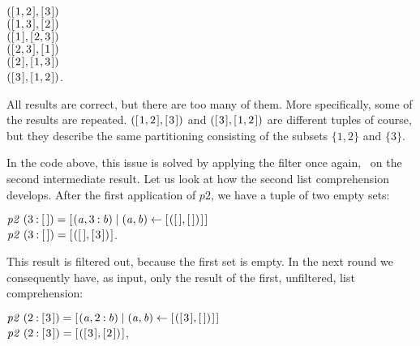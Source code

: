\documentclass{scrreprt}
\newcommand{\Varid}[1]{\mathit{#1}}
\begin{document}
\ensuremath{([\mskip1.5mu \mathrm{1},\mathrm{2}\mskip1.5mu],[\mskip1.5mu \mathrm{3}\mskip1.5mu])}\\
\ensuremath{([\mskip1.5mu \mathrm{1},\mathrm{3}\mskip1.5mu],[\mskip1.5mu \mathrm{2}\mskip1.5mu])}\\
\ensuremath{([\mskip1.5mu \mathrm{1}\mskip1.5mu],[\mskip1.5mu \mathrm{2},\mathrm{3}\mskip1.5mu])}\\
\ensuremath{([\mskip1.5mu \mathrm{2},\mathrm{3}\mskip1.5mu],[\mskip1.5mu \mathrm{1}\mskip1.5mu])}\\
\ensuremath{([\mskip1.5mu \mathrm{2}\mskip1.5mu],[\mskip1.5mu \mathrm{1},\mathrm{3}\mskip1.5mu])}\\
\ensuremath{([\mskip1.5mu \mathrm{3}\mskip1.5mu],[\mskip1.5mu \mathrm{1},\mathrm{2}\mskip1.5mu])}.

All results are correct,
but there are too many of them.
More specifically, some of the results are repeated.
\ensuremath{([\mskip1.5mu \mathrm{1},\mathrm{2}\mskip1.5mu],[\mskip1.5mu \mathrm{3}\mskip1.5mu])} and \ensuremath{([\mskip1.5mu \mathrm{3}\mskip1.5mu],[\mskip1.5mu \mathrm{1},\mathrm{2}\mskip1.5mu])} are different tuples of course,
but they describe the same partitioning
consisting of the subsets 
$\lbrace 1,2\rbrace$ and $\lbrace 3\rbrace$.

In the code above, this issue is solved
by applying the filter once again, \viz\
on the second intermediate result.
Let us look at how the second list comprehension develops.
After the first application of \ensuremath{\Varid{p2}},
we have a tuple of two empty sets:

\ensuremath{\Varid{p2}\;(\mathrm{3}\mathbin{:}[\mskip1.5mu \mskip1.5mu])\mathrel{=}[\mskip1.5mu (\Varid{a},\mathrm{3}\mathbin{:}\Varid{b})\mid (\Varid{a},\Varid{b})\leftarrow [\mskip1.5mu ([\mskip1.5mu \mskip1.5mu],[\mskip1.5mu \mskip1.5mu])\mskip1.5mu]\mskip1.5mu]}\\
\ensuremath{\Varid{p2}\;(\mathrm{3}\mathbin{:}[\mskip1.5mu \mskip1.5mu])\mathrel{=}[\mskip1.5mu ([\mskip1.5mu \mskip1.5mu],[\mskip1.5mu \mathrm{3}\mskip1.5mu])\mskip1.5mu]}.

This result is filtered out, because the first set is empty.
In the next round we consequently have, as input, 
only the result of the first, unfiltered, list comprehension:

\ensuremath{\Varid{p2}\;(\mathrm{2}\mathbin{:}[\mskip1.5mu \mathrm{3}\mskip1.5mu])\mathrel{=}[\mskip1.5mu (\Varid{a},\mathrm{2}\mathbin{:}\Varid{b})\mid (\Varid{a},\Varid{b})\leftarrow [\mskip1.5mu ([\mskip1.5mu \mathrm{3}\mskip1.5mu],[\mskip1.5mu \mskip1.5mu])\mskip1.5mu]\mskip1.5mu]}\\
\ensuremath{\Varid{p2}\;(\mathrm{2}\mathbin{:}[\mskip1.5mu \mathrm{3}\mskip1.5mu])\mathrel{=}[\mskip1.5mu ([\mskip1.5mu \mathrm{3}\mskip1.5mu],[\mskip1.5mu \mathrm{2}\mskip1.5mu])\mskip1.5mu]},\\
\end{document}
